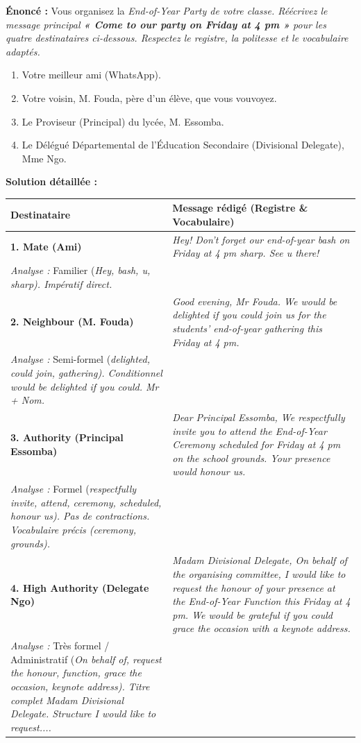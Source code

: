 \documentclass[11pt]{article}
\newcommand{\eng}[1]{\ifmmode\text{\textit{#1}}\else\begingroup\selectlanguage{english}\itshape #1\endgroup\fi}
\begin{document}
\begin{exoresolu}
\textbf{Énoncé :} Vous organisez la \eng{End-of-Year Party} de votre classe. Réécrivez le message principal \textbf{« Come to our party on Friday at 4 pm »} pour les quatre destinataires ci-dessous. Respectez le registre, la politesse et le vocabulaire adaptés.

\begin{enumerate}
    \item Votre meilleur ami (WhatsApp).
    \item Votre voisin, M. Fouda, père d'un élève, que vous vouvoyez.
    \item Le Proviseur (Principal) du lycée, M. Essomba.
    \item Le Délégué Départemental de l'Éducation Secondaire (Divisional Delegate), Mme Ngo.
\end{enumerate}

\tcblower
\textbf{Solution détaillée :}

\begin{center}
\begin{tabularx}{\linewidth}{|X|X|}
\hline
\rowcolor{popblueL} \textbf{Destinataire} & \textbf{Message rédigé (Registre \& Vocabulaire)} \\ \hline
\textbf{1. Mate (Ami)} & \eng{Hey! Don't forget our end-of-year bash on Friday at 4 pm sharp. See u there!} \\
\rowcolor{popcream} \textit{Analyse :} Familier (\eng{Hey, bash, u, sharp}). Impératif direct. \\ \hline
\textbf{2. Neighbour (M. Fouda)} & \eng{Good evening, Mr Fouda. We would be delighted if you could join us for the students' end-of-year gathering this Friday at 4 pm.} \\
\rowcolor{popcream} \textit{Analyse :} Semi-formel (\eng{delighted, could join, gathering}). Conditionnel \eng{would be delighted if you could}. \eng{Mr + Nom}. \\ \hline
\textbf{3. Authority (Principal Essomba)} & \eng{Dear Principal Essomba, We respectfully invite you to attend the End-of-Year Ceremony scheduled for Friday at 4 pm on the school grounds. Your presence would honour us.} \\
\rowcolor{popcream} \textit{Analyse :} Formel (\eng{respectfully invite, attend, ceremony, scheduled, honour us}). Pas de contractions. Vocabulaire précis (\eng{ceremony, grounds}). \\ \hline
\textbf{4. High Authority (Delegate Ngo)} & \eng{Madam Divisional Delegate, On behalf of the organising committee, I would like to request the honour of your presence at the End-of-Year Function this Friday at 4 pm. We would be grateful if you could grace the occasion with a keynote address.} \\
\rowcolor{popcream} \textit{Analyse :} Très formel / Administratif (\eng{On behalf of, request the honour, function, grace the occasion, keynote address}). Titre complet \eng{Madam Divisional Delegate}. Structure \eng{I would like to request...}. \\ \hline
\end{tabularx}
\end{center}


\end{exoresolu}
\end{document}

